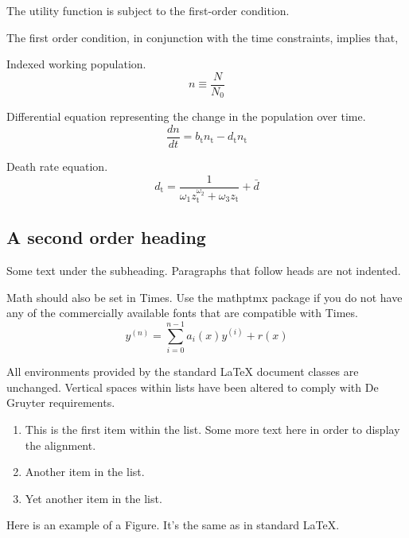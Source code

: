 \documentclass[letterpaper,12pt]{article}
\begin{document}
The utility function is subject to the first-order condition.


The first order condition, in conjunction with the time constraints, implies that,

Indexed working population.
\begin{equation}
n \equiv \frac{N}{N_\mathrm{0}}
\end{equation}

Differential equation representing the change in the population over time.
\begin{equation}
\frac{dn}{dt} = b_\mathrm{t} n_\mathrm{t} - d_\mathrm{t} n_\mathrm{t}
\end{equation}

Death rate equation.
\begin{equation} \label{deathrate}
d_\mathrm{t} = \frac{1}{\omega_\mathrm{1} z_\mathrm{t}^{\omega_\mathrm{2}} + \omega_\mathrm{3} z_\mathrm{t}} + \bar d
\end{equation}

\subsection{A second order heading}

Some text under the subheading. Paragraphs that follow heads are not
indented.

Math should also be set in Times. Use the mathptmx package if you do not have
any of the commercially available fonts that are compatible with Times.
\begin{equation}
    y^{(n)} = \sum_{i=0}^{n-1} a_i(x) y^{(i)} + r(x) 
\end{equation}

All environments provided by the standard LaTeX document classes are
unchanged. Vertical spaces within lists have been altered to comply with De Gruyter
requirements.
\begin{enumerate}
\item This is the first item within the list. Some more text here in order to
  display the alignment.
\item Another item in the list.
\item Yet another item in the list.
\end{enumerate}

Here is an example of a Figure. It's the same as in standard LaTeX.
\end{document}
